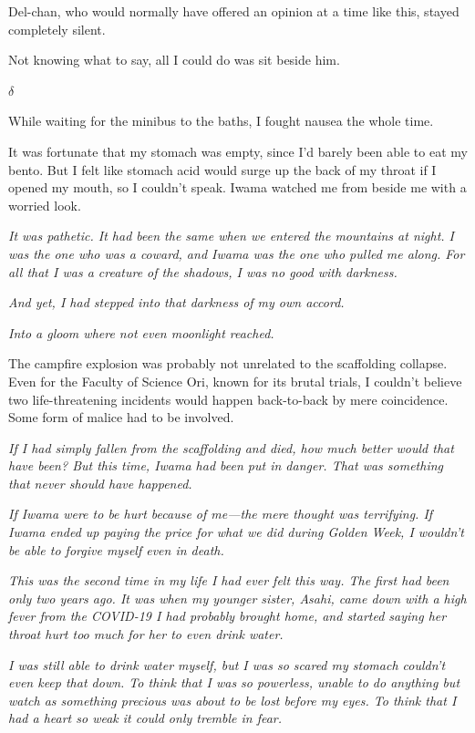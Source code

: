 \documentclass[
    a4paper,
    12pt,
    twoside,
    openany,
    UTF8,
    fontset=windows
]{ctexbook}
\begin{document}
Del-chan, who would normally have offered an opinion at a time like this, stayed completely silent.

Not knowing what to say, all I could do was sit beside him.

$\delta$

While waiting for the minibus to the baths, I fought nausea the whole time.

It was fortunate that my stomach was empty, since I'd barely been able to eat my bento. But I felt like stomach acid would surge up the back of my throat if I opened my mouth, so I couldn't speak. Iwama watched me from beside me with a worried look.

\textit{It was pathetic. It had been the same when we entered the mountains at night. I was the one who was a coward, and Iwama was the one who pulled me along. For all that I was a creature of the shadows, I was no good with darkness.}

\textit{And yet, I had stepped into that darkness of my own accord.}

\textit{Into a gloom where not even moonlight reached.}

The campfire explosion was probably not unrelated to the scaffolding collapse. Even for the Faculty of Science Ori, known for its brutal trials, I couldn't believe two life-threatening incidents would happen back-to-back by mere coincidence. Some form of malice had to be involved.

\textit{If I had simply fallen from the scaffolding and died, how much better would that have been? But this time, Iwama had been put in danger. That was something that never should have happened.}

\textit{If Iwama were to be hurt because of me---the mere thought was terrifying. If Iwama ended up paying the price for what we did during Golden Week, I wouldn't be able to forgive myself even in death.}

\textit{This was the second time in my life I had ever felt this way. The first had been only two years ago. It was when my younger sister, Asahi, came down with a high fever from the COVID-19 I had probably brought home, and started saying her throat hurt too much for her to even drink water.}

\textit{I was still able to drink water myself, but I was so scared my stomach couldn't even keep that down. To think that I was so powerless, unable to do anything but watch as something precious was about to be lost before my eyes. To think that I had a heart so weak it could only tremble in fear.}
\end{document}
